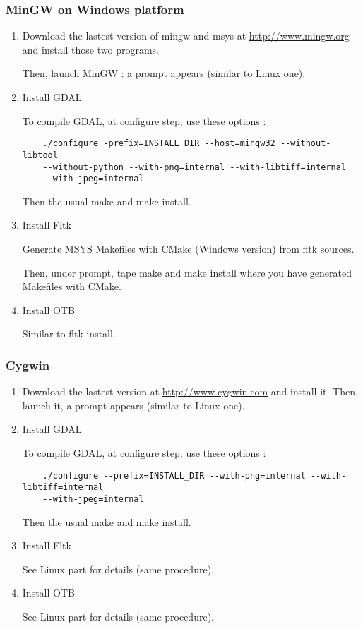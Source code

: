 \subsubsection{MinGW on Windows platform}
\begin{enumerate}

\item Download the lastest version of mingw and msys at \url{http://www.mingw.org} and install those 
	two programs.

	Then, launch MinGW : a prompt appears (similar to Linux one).

\item Install GDAL

	To compile GDAL, at configure step, use these options :
\begin{verbatim}
	./configure -prefix=INSTALL_DIR --host=mingw32 --without-libtool 
	--without-python --with-png=internal --with-libtiff=internal
	--with-jpeg=internal
\end{verbatim}
	Then the usual make and make install.

\item Install Fltk

	Generate MSYS Makefiles with CMake (Windows version) from fltk sources.
	
	Then, under prompt, tape make and make install where you have generated Makefiles with CMake.

\item Install OTB

	Similar to fltk install.

\end{enumerate}

\subsubsection{Cygwin}
\begin{enumerate}

\item Download the lastest version at \url{http://www.cygwin.com} and install it.
	Then, launch it, a prompt appears (similar to Linux one).

\item Install GDAL

	To compile GDAL, at configure step, use these options :
\begin{verbatim}
	./configure --prefix=INSTALL_DIR --with-png=internal --with-libtiff=internal
	--with-jpeg=internal
\end{verbatim}
	Then the usual make and make install.

\item Install Fltk

	See Linux part for details (same procedure).

\item Install OTB

	See Linux part for details (same procedure).
\end{enumerate}


